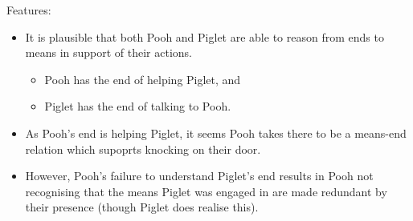 \documentclass[10pt]{article}
\newcommand{\hozlinedash}[0]{%
  \noindent\hdashrule[0.5ex][c]{\textwidth}{.1pt}{2.5pt}
}
\begin{document}
Features:
\begin{itemize}
\item It is plausible that both Pooh and Piglet are able to reason from ends to means in support of their actions.
  \begin{itemize}
  \item Pooh has the end of helping Piglet, and
  \item Piglet has the end of talking to Pooh.
  \end{itemize}
\item As Pooh's end is helping Piglet, it seems Pooh takes there to be a means-end relation which supoprts knocking on their door.
\item However, Pooh's failure to understand Piglet's end results in Pooh not recognising that the means Piglet was engaged in are made redundant by their presence (though Piglet does realise this).

\end{itemize}





\newpage


\printbibliography








\end{document}

